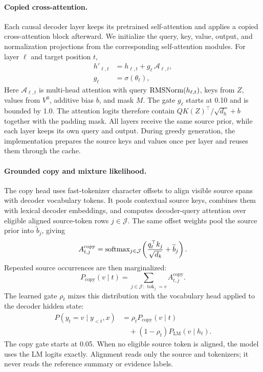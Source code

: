 \paragraph{Copied cross-attention.}
Each causal decoder layer keeps its pretrained self-attention and applies a
copied cross-attention block afterward.  We initialize the query, key, value,
output, and normalization projections from the corresponding self-attention
modules.  For layer $\ell$ and target position $t$,
\begin{equation}
  \begin{aligned}
    h'_{\ell,t}&=h_{\ell,t}+g_\ell\,\mathcal A_{\ell,t},\\
    g_\ell&=\sigma(\theta_\ell),
  \end{aligned}
  \label{eq:cross-attn}
\end{equation}
Here $\mathcal A_{\ell,t}$ is multi-head attention with query
$\operatorname{RMSNorm}(h_{\ell,t})$, keys from $Z$, values from $V^0$, additive bias $b$,
and mask $M$.  The gate $g_\ell$ starts at 0.10 and is bounded by 1.0.  The
attention logits therefore contain $QK(Z)^\top/\sqrt{d_h}+b$ together with the
padding mask.  All layers receive the same source prior, while each layer keeps
its own query and output.  During greedy generation, the implementation
prepares the source keys and values once per layer and reuses them through the
cache.

\paragraph{Grounded copy and mixture likelihood.}
The copy head uses fast-tokenizer character offsets to align visible source
spans with decoder vocabulary tokens.  It pools contextual source keys,
combines them with lexical decoder embeddings, and computes decoder-query
attention over eligible aligned source-token rows $j\in\mathcal J$.  The same
offset weights pool the source prior into $\widetilde b_j$, giving
\begin{equation}
  A^{\mathrm{copy}}_{t,j}=\operatorname{softmax}_{j\in\mathcal J}\!\left(
  \frac{q_t^{\top}k_j}{\sqrt{d_k}}+\widetilde b_j\right).
  \label{eq:copy-attn}
\end{equation}
Repeated source occurrences are then marginalized:
\begin{equation}
  P_{\mathrm{copy}}(v\mid t)=\sum_{j\in\mathcal J:\,\operatorname{tok}_j=v}
  A^{\mathrm{copy}}_{t,j}.
  \label{eq:copy}
\end{equation}
The learned gate $\rho_t$ mixes this distribution with the vocabulary head
applied to the decoder hidden state:
\begin{equation}
  \begin{aligned}
    P(y_t=v\mid y_{<t},x)&=\rho_tP_{\mathrm{copy}}(v\mid t)\\
      &\quad +(1-\rho_t)P_{\mathrm{LM}}(v\mid h_t).
  \end{aligned}
  \label{eq:mixture}
\end{equation}
The copy gate starts at 0.05.  When no eligible source token is aligned, the
model uses the LM logits exactly.  Alignment reads only the source and
tokenizers; it never reads the reference summary or evidence labels.

